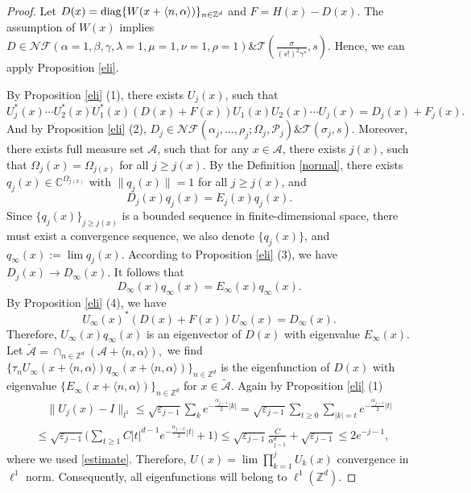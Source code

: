 \documentclass[11pt]{amsart}
\theoremstyle{remark}
\theoremstyle{definition}
\newcommand{\C}{{\mathbf C}}
\newcommand{\Z}{{\mathbf Z}}
\newcommand{\diag}{{\rm diag}}
\def \C{{\mathcal{C}}}
\def \Z{\mathcal{Z}}
\def\Z{{\mathbb Z}}
\def\C{{\mathbb C}}
\begin{document}
\begin{proof}
    Let $D(x)=\diag\{W(x+\langle n,\alpha\rangle)\}_{n\in\Z^d}$ and $F=H(x)-D(x)$. The assumption of $W(x)$ implies $D\in \mathcal{N} \mathcal{F}(\alpha=1,\beta,\gamma,\lambda=1, \mu=1,\nu=1,\rho=1) \& \mathcal{T}(\frac{\sigma}{(s!)^2\gamma^s}, s).$ Hence, we can apply Proposition \ref{eli}.
    
By Proposition \ref{eli} (1), there exists $U_j(x)$, such that
$$U_j^*(x)\cdots U_2^*(x)U_1^*(x)(D(x)+F(x))U_1(x)U_2(x)\cdots U_j(x)={D}_{j}(x)+F_j(x).$$
And by Proposition \ref{eli} (2), $D_j\in \mathcal{N} \mathcal{F}(\alpha_j, \ldots, \rho_j ; \Omega_j, \mathcal{P}_j) \& \mathcal{T}(\sigma_j, s)$. Moreover, there exists full measure set $\mathcal{A}$, such that for any $x\in\mathcal{A}$, there exists $j(x)$, such that $\Omega_j(x)=\Omega_{j(x)}$ for all $j\geq j(x).$ By the Definition \ref{normal}, there exists $q_j(x)\in\C^{\Omega_{j(x)}}$ with $\|q_j(x)\|=1$ for all $j\geq j(x)$, and $$D_j(x)q_j(x)=E_j(x)q_j(x).$$
Since $\{q_j(x)\}_{j\geq j(x)}$ is a bounded sequence in finite-dimensional space, there must exist a convergence sequence, we also denote $\{q_j(x)\}$, and $q_\infty(x):=\lim q_j(x).$
According to Proposition \ref{eli} (3), we have $D_j(x)\rightarrow D_{\infty}(x)$. It follows that 
$$D_\infty(x)q_\infty(x)=E_\infty(x)q_\infty(x).$$
By Proposition \ref{eli} (4), we have 
$$U_{\infty}(x)^*(D(x)+F(x))U_\infty(x)=D_{\infty}(x).$$
Therefore, $U_\infty(x)q_{\infty}(x)$ is an eigenvector of $D(x)$ with eigenvalue $E_{\infty}(x)$.
Let $\tilde{\mathcal{A}}=\cap_{n\in\Z^d}(\mathcal{A}+\langle n,\alpha\rangle),$
we find $\{ \tau_{n}U_\infty(x+\langle n,\alpha\rangle)q_{\infty}(x+\langle n,\alpha\rangle)\}_{n\in\Z^d}$ is the eigenfunction of $D(x)$ with eigenvalue $\{E_{\infty}(x+\langle n,\alpha\rangle)\}_{n\in\Z^d}$ for $x\in\tilde{\mathcal{A}}.$ 
Again by Proposition \ref{eli} (1) 
$$
\begin{aligned}
&\quad\|U_j(x)-I\|_{l^1}\leq\sqrt{\varepsilon_{j-1}}\sum_{k}e^{-\frac{\alpha_{j-1}}{2}|k|}=\sqrt{\varepsilon_{j-1}}\sum_{t\geq0}\sum_{|k|=t}e^{-\frac{\alpha_{j-1}}{2}|t|}\\
&\leq\sqrt{\varepsilon_{j-1}}\bigg(\sum_{t\geq 1}C|t|^{d-1}e^{-\frac{\alpha_{j-1]}}{2}|t|}+1\bigg)
\leq\sqrt{\varepsilon_{j-1}}\frac{C}{\alpha_{j-1}^d}+\sqrt{\varepsilon_{j-1}}\leq  2e^{-{j-1}},
\end{aligned}$$
where we used \eqref{estimate}.
Therefore, $U(x)=\lim\prod_{k=1}^{j}U_k(x)$ convergence in $\ell^1$ norm. Consequently, all eigenfunctions will belong to $\ell^1(\Z^d).$ 
    
\end{proof}
\end{document}
